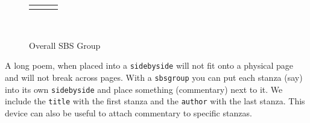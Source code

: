 \documentclass[10pt,]{article}
\theoremstyle{plain}
\theoremstyle{definition}
\theoremstyle{definition}
\theoremstyle{definition}
\theoremstyle{definition}
\theoremstyle{definition}
\theoremstyle{definition}
\numberwithin{equation}{section}
\newlength{\panelmax}
\begin{document}
\begin{figure}
{\setlength{\phAp}{\ht\panelboxAp+\dp\panelboxAp}
\settototalheight{\phAp}{\usebox{\panelboxAp}}
\setlength{\panelmax}{\maxof{\panelmax}{\phAp}}
\ifdefined\panelboxBp\else\newsavebox{\panelboxBp}\fi%
\ifdefined\phBp\else\newlength{\phBp}\fi%
\setlength{\phBp}{\ht\panelboxBp+\dp\panelboxBp}
\settototalheight{\phBp}{\usebox{\panelboxBp}}
\setlength{\panelmax}{\maxof{\panelmax}{\phBp}}
\ifdefined\panelboxCp\else\newsavebox{\panelboxCp}\fi%
\ifdefined\phCp\else\newlength{\phCp}\fi%
\setlength{\phCp}{\ht\panelboxCp+\dp\panelboxCp}
\settototalheight{\phCp}{\usebox{\panelboxCp}}
\setlength{\panelmax}{\maxof{\panelmax}{\phCp}}
\leavevmode%
\setlength{\tabcolsep}{0.075\linewidth}
\par\medskip\noindent
\hspace*{0.05\linewidth}%
\begin{tabular}{@{}*{3}{c}@{}}
\begin{minipage}[c][\panelmax][t]{0.25\linewidth}\usebox{\panelboxAp}\end{minipage}&
\begin{minipage}[c][\panelmax][t]{0.2\linewidth}\usebox{\panelboxBp}\end{minipage}&
\begin{minipage}[c][\panelmax][t]{0.15\linewidth}\usebox{\panelboxCp}\end{minipage}\end{tabular}\\
}%
\caption{Overall SBS Group\label{figure-75}}
\end{figure}
\hypertarget{p-726}{}%
A long poem, when placed into a \lstinline?sidebyside? will not fit onto a physical page and will not break across pages.  With a \lstinline?sbsgroup? you can put each stanza (say) into its own \lstinline?sidebyside? and place something (commentary) next to it.  We include the \lstinline?title? with the first stanza and the \lstinline?author? with the last stanza.  This device can also be useful to attach commentary to specific stanzas.%
\end{document}
